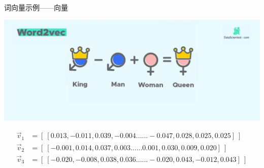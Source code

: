 \documentclass{beamer}
\begin{document}
\begin{frame}{词向量示例——向量}
    \vspace{0.2cm}
    \begin{center}
        \includegraphics[width=\textwidth]{pic/word2vec2.png}
    \end{center}
    \vspace{-0.2cm}
    \begin{align*}
        \vec{v}_1 & = [ ~[0.013, -0.011, 0.039, -0.004......-0.047, 0.028, 0.025, 0.025]~ ] \\[0.2cm]
        \vec{v}_2 & = [ ~[-0.001, 0.014, 0.037, 0.003......0.001, 0.030, 0.009, 0.020]~ ] \\[0.2cm]
        \vec{v}_3 & = [ ~[-0.020, -0.008, 0.038, 0.036......-0.020, 0.043, -0.012, 0.043]~ ]
    \end{align*}
\end{frame}
\end{document}

